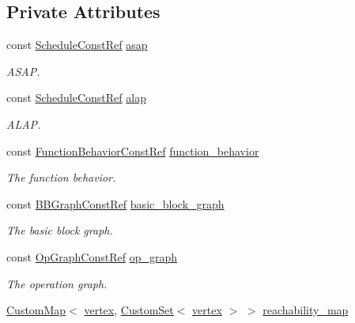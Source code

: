 \subsection*{Private Attributes}
\begin{DoxyCompactItemize}
\item 
const \hyperlink{schedule_8hpp_a85e4dea8a1611026193d8ca13fc5a260}{Schedule\+Const\+Ref} \hyperlink{classSDCSorter_a1dab096ae008e4596743d5f7ec66ac80}{asap}
\begin{DoxyCompactList}\small\item\em A\+S\+AP. \end{DoxyCompactList}\item 
const \hyperlink{schedule_8hpp_a85e4dea8a1611026193d8ca13fc5a260}{Schedule\+Const\+Ref} \hyperlink{classSDCSorter_ac710ac9e206640b866366fb1b6e08bc7}{alap}
\begin{DoxyCompactList}\small\item\em A\+L\+AP. \end{DoxyCompactList}\item 
const \hyperlink{function__behavior_8hpp_a94872da12ed056b6ecf90456164e0213}{Function\+Behavior\+Const\+Ref} \hyperlink{classSDCSorter_ae144eaf07200860641d0f31cf55e7304}{function\+\_\+behavior}
\begin{DoxyCompactList}\small\item\em The function behavior. \end{DoxyCompactList}\item 
const \hyperlink{basic__block_8hpp_ab66bdbde3a29e41d079d8a320af9c921}{B\+B\+Graph\+Const\+Ref} \hyperlink{classSDCSorter_adf61c72ec9b15ca0417ea2336d1f1547}{basic\+\_\+block\+\_\+graph}
\begin{DoxyCompactList}\small\item\em The basic block graph. \end{DoxyCompactList}\item 
const \hyperlink{op__graph_8hpp_a9a0b240622c47584bee6951a6f5de746}{Op\+Graph\+Const\+Ref} \hyperlink{classSDCSorter_ae39d5d1c82f5335025d9facccabc4020}{op\+\_\+graph}
\begin{DoxyCompactList}\small\item\em The operation graph. \end{DoxyCompactList}\item 
\hyperlink{custom__map_8hpp_a18ca01763abbe3e5623223bfe5aaac6b}{Custom\+Map}$<$ \hyperlink{graph_8hpp_abefdcf0544e601805af44eca032cca14}{vertex}, \hyperlink{custom__set_8hpp_a615bc2f42fc38a4bb1790d12c759e86f}{Custom\+Set}$<$ \hyperlink{graph_8hpp_abefdcf0544e601805af44eca032cca14}{vertex} $>$ $>$ \hyperlink{classSDCSorter_a393d3f55435fe0038f30a17abf13ccfe}{reachability\+\_\+map}

\end{DoxyCompactItemize}
